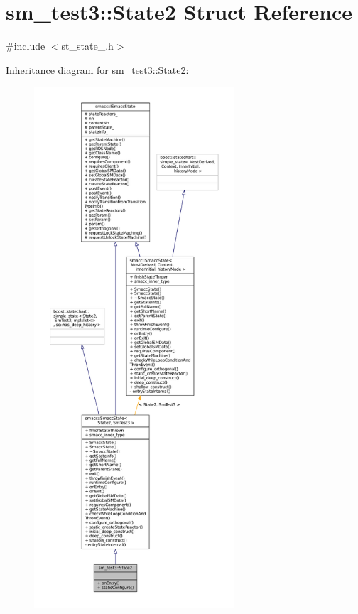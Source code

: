 \hypertarget{structsm__test3_1_1State2}{}\section{sm\+\_\+test3\+:\+:State2 Struct Reference}
\label{structsm__test3_1_1State2}


{\ttfamily \#include $<$st\+\_\+state\+\_.\+h$>$}



Inheritance diagram for sm\+\_\+test3\+:\+:State2\+:
\nopagebreak
\begin{figure}[H]
\begin{center}
\leavevmode
\includegraphics[height=550pt]{structsm__test3_1_1State2__inherit__graph}
\end{center}
\end{figure}


